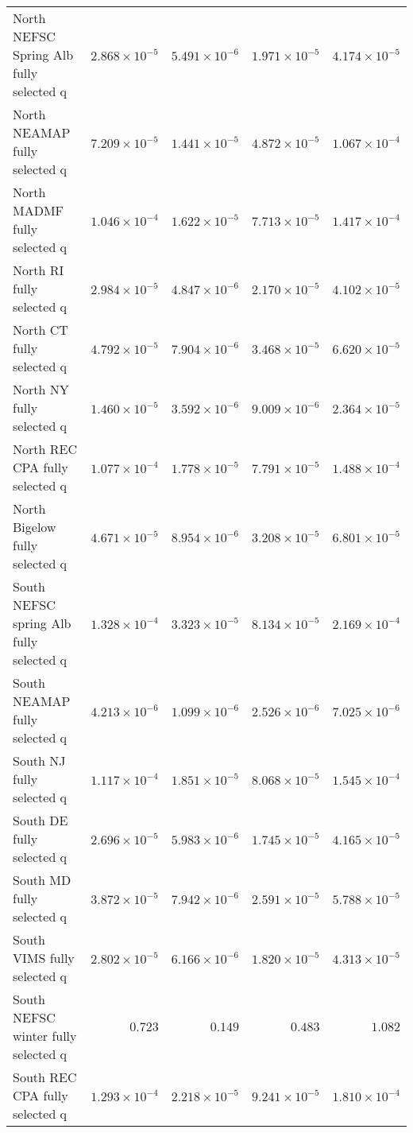 \documentclass[
]{article}
\begin{document}
\begin{landscape}
\begin{longtable}[t]{lrrrr}
\addlinespace
North NEFSC Spring Alb fully selected q & $2.868\times 10^{-5}$ & $5.491\times 10^{-6}$ & $1.971\times 10^{-5}$ & $4.174\times 10^{-5}$\\
North NEAMAP fully selected q & $7.209\times 10^{-5}$ & $1.441\times 10^{-5}$ & $4.872\times 10^{-5}$ & $1.067\times 10^{-4}$\\
North MADMF fully selected q & $1.046\times 10^{-4}$ & $1.622\times 10^{-5}$ & $7.713\times 10^{-5}$ & $1.417\times 10^{-4}$\\
North RI fully selected q & $2.984\times 10^{-5}$ & $4.847\times 10^{-6}$ & $2.170\times 10^{-5}$ & $4.102\times 10^{-5}$\\
North CT fully selected q & $4.792\times 10^{-5}$ & $7.904\times 10^{-6}$ & $3.468\times 10^{-5}$ & $6.620\times 10^{-5}$\\
\addlinespace
North NY fully selected q & $1.460\times 10^{-5}$ & $3.592\times 10^{-6}$ & $9.009\times 10^{-6}$ & $2.364\times 10^{-5}$\\
North REC CPA fully selected q & $1.077\times 10^{-4}$ & $1.778\times 10^{-5}$ & $7.791\times 10^{-5}$ & $1.488\times 10^{-4}$\\
North Bigelow fully selected q & $4.671\times 10^{-5}$ & $8.954\times 10^{-6}$ & $3.208\times 10^{-5}$ & $6.801\times 10^{-5}$\\
South NEFSC spring Alb fully selected q & $1.328\times 10^{-4}$ & $3.323\times 10^{-5}$ & $8.134\times 10^{-5}$ & $2.169\times 10^{-4}$\\
South NEAMAP fully selected q & $4.213\times 10^{-6}$ & $1.099\times 10^{-6}$ & $2.526\times 10^{-6}$ & $7.025\times 10^{-6}$\\
\addlinespace
South NJ fully selected q & $1.117\times 10^{-4}$ & $1.851\times 10^{-5}$ & $8.068\times 10^{-5}$ & $1.545\times 10^{-4}$\\
South DE fully selected q & $2.696\times 10^{-5}$ & $5.983\times 10^{-6}$ & $1.745\times 10^{-5}$ & $4.165\times 10^{-5}$\\
South MD fully selected q & $3.872\times 10^{-5}$ & $7.942\times 10^{-6}$ & $2.591\times 10^{-5}$ & $5.788\times 10^{-5}$\\
South VIMS fully selected q & $2.802\times 10^{-5}$ & $6.166\times 10^{-6}$ & $1.820\times 10^{-5}$ & $4.313\times 10^{-5}$\\
South NEFSC winter fully selected q & $0.723$ & $0.149$ & $0.483$ & $1.082$\\
\addlinespace
South REC CPA fully selected q & $1.293\times 10^{-4}$ & $2.218\times 10^{-5}$ & $9.241\times 10^{-5}$ & $1.810\times 10^{-4}$\\

\end{longtable}
\end{landscape}
\end{document}
